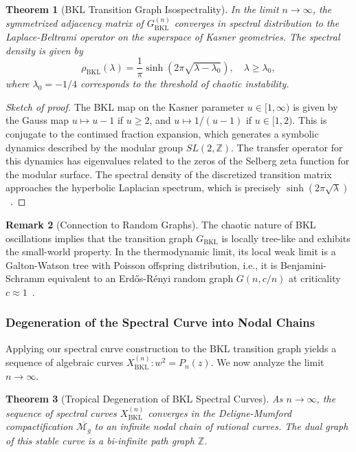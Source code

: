 \documentclass[12pt]{article}
\newtheorem{theorem}{Theorem}[section]
\theoremstyle{definition}
\newtheorem{remark}[theorem]{Remark}
\begin{document}
\begin{theorem}[BKL Transition Graph Isospectrality]\label{thm:bkl_isospectral}
In the limit $n \to \infty$, the symmetrized adjacency matrix of $G_{\text{BKL}}^{(n)}$ converges in spectral distribution to the Laplace-Beltrami operator on the superspace of Kasner geometries. The spectral density is given by
\[
\rho_{\text{BKL}}(\lambda) = \frac{1}{\pi} \sinh\left(2\pi \sqrt{\lambda - \lambda_0}\right), \quad \lambda \ge \lambda_0,
\]
where $\lambda_0 = -1/4$ corresponds to the threshold of chaotic instability.
\end{theorem}

\begin{proof}[Sketch of proof]
The BKL map on the Kasner parameter $u \in [1,\infty)$ is given by the Gauss map $u \mapsto u-1$ if $u \ge 2$, and $u \mapsto 1/(u-1)$ if $u \in [1,2)$. This is conjugate to the continued fraction expansion, which generates a symbolic dynamics described by the modular group $SL(2,\mathbb Z)$. The transfer operator for this dynamics has eigenvalues related to the zeros of the Selberg zeta function for the modular surface. The spectral density of the discretized transition matrix approaches the hyperbolic Laplacian spectrum, which is precisely $\sinh(2\pi\sqrt{\lambda})$~\cite{Mayer1991, Efthimiou2012}.
\end{proof}

\begin{remark}[Connection to Random Graphs]
The chaotic nature of BKL oscillations implies that the transition graph $G_{\text{BKL}}$ is locally tree-like and exhibits the small-world property. In the thermodynamic limit, its local weak limit is a Galton-Watson tree with Poisson offspring distribution, i.e., it is Benjamini-Schramm equivalent to an Erd\H{o}s-R\'enyi random graph $G(n, c/n)$ at criticality $c \approx 1$~\cite{Dembo2016}.
\end{remark}

\subsubsection{Degeneration of the Spectral Curve into Nodal Chains}
Applying our spectral curve construction to the BKL transition graph yields a sequence of algebraic curves $X_{\text{BKL}}^{(n)}: w^2 = P_n(z)$. We now analyze the limit $n \to \infty$.

\begin{theorem}[Tropical Degeneration of BKL Spectral Curves]\label{thm:tropical_degeneration}
As $n \to \infty$, the sequence of spectral curves $X_{\text{BKL}}^{(n)}$ converges in the Deligne-Mumford compactification $\overline{\mathcal{M}_g}$ to an \emph{infinite nodal chain} of rational curves. The dual graph of this stable curve is a bi-infinite path graph $\mathbb Z$.
\end{theorem}
\end{document}
